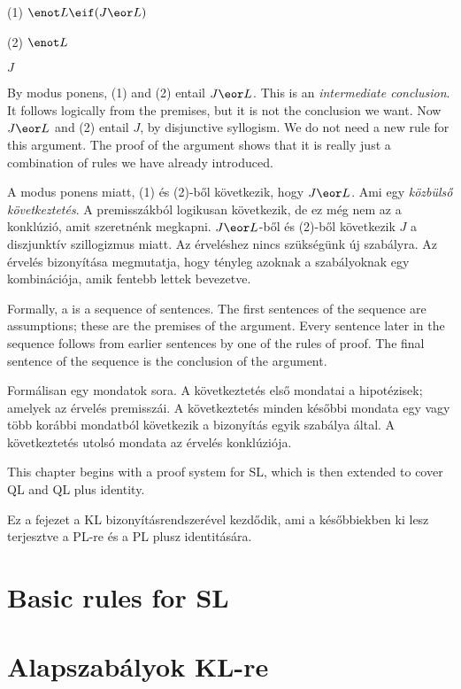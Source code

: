 \begin{earg}
\item[(1)] $\enot L \eif (J \eor L)$
\item[(2)] $\enot L$
\item[\therefore] $J$
\end{earg}
By modus ponens, (1) and (2) entail $J \eor L$. This is an \emph{intermediate conclusion}. It follows logically from the premises, but it is not the conclusion we want. Now $J \eor L$ and (2) entail $J$, by disjunctive syllogism. We do not need a new rule for this argument. The proof of the argument shows that it is really just a combination of rules we have already introduced.

A modus ponens miatt, (1) és (2)-ből következik, hogy $J \eor L$. Ami egy \emph{közbülső következtetés}. A premisszákból logikusan következik, de ez még nem az a konklúzió, amit szeretnénk megkapni. $J \eor L$-ből és (2)-ből következik $J$ a diszjunktív szillogizmus miatt. Az érveléshez nincs szükségünk új szabályra. Az érvelés bizonyítása megmutatja, hogy tényleg azoknak a szabályoknak egy kombinációja, amik fentebb lettek bevezetve.

Formally, a  is a sequence of sentences. The first sentences of the sequence are assumptions; these are the premises of the argument. Every sentence later in the sequence follows from earlier sentences by one of the rules of proof. The final sentence of the sequence is the conclusion of the argument.

Formálisan egy  mondatok sora. A következtetés első mondatai a hipotézisek; amelyek az érvelés premisszái. A következtetés minden későbbi mondata egy vagy több korábbi mondatból következik a bizonyítás egyik szabálya által. A következtetés utolsó mondata az érvelés konklúziója.

This chapter begins with a proof system for SL, which is then extended to cover QL and QL plus identity.

Ez a fejezet a KL bizonyításrendszerével kezdődik, ami a későbbiekben ki lesz terjesztve a PL-re és a PL plusz identitására.

\section*{Basic rules for SL}
\section{Alapszabályok KL-re}

